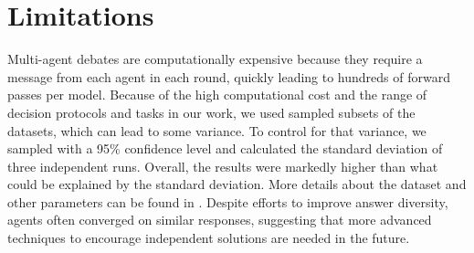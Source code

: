 \section*{Limitations} %
Multi-agent debates are computationally expensive because they require a message from each agent in each round, quickly leading to hundreds of forward passes per model.
Because of the high computational cost and the range of decision protocols and tasks in our work, we used sampled subsets of the datasets, which can lead to some variance.
To control for that variance, we sampled with a 95\% confidence level and calculated the standard deviation of three independent runs.%
Overall, the results were markedly higher than what could be explained by the standard deviation.
More details about the dataset and other parameters can be found in .
Despite efforts to improve answer diversity, agents often converged on similar responses, suggesting that more advanced techniques to encourage independent solutions are needed in the future.

